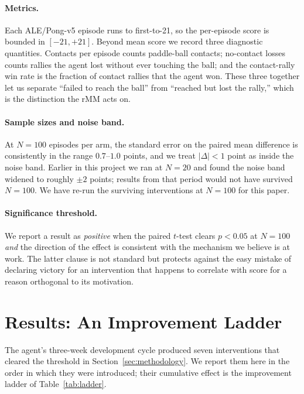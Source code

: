 \documentclass[runningheads]{llncs}
\begin{document}
\paragraph{Metrics.}
Each ALE/Pong-v5 episode runs to first-to-21, so the per-episode
score is bounded in $[-21, +21]$. Beyond mean score we record three
diagnostic quantities. Contacts per episode counts paddle-ball
contacts; no-contact losses counts rallies the agent lost without
ever touching the ball; and the contact-rally win rate is the
fraction of contact rallies that the agent won. These three
together let us separate ``failed to reach the ball'' from
``reached but lost the rally,'' which is the distinction the rMM
acts on.

\paragraph{Sample sizes and noise band.}
At $N=100$ episodes per arm, the standard error on the paired mean
difference is consistently in the range $0.7$--$1.0$ points, and we
treat $|\Delta| < 1$ point as inside the noise band. Earlier in
this project we ran at $N=20$ and found the noise band widened to
roughly $\pm 2$ points; results from that period would not have
survived $N=100$. We have re-run the surviving interventions at
$N=100$ for this paper.

\paragraph{Significance threshold.}
We report a result as \emph{positive} when the paired $t$-test
clears $p < 0.05$ at $N=100$ \emph{and} the direction of the effect
is consistent with the mechanism we believe is at work. The latter
clause is not standard but protects against the easy mistake of
declaring victory for an intervention that happens to correlate
with score for a reason orthogonal to its motivation.

\section{Results: An Improvement Ladder}\label{sec:results}

The agent's three-week development cycle produced seven
interventions that cleared the threshold in
Section~\ref{sec:methodology}. We report them here in the order in
which they were introduced; their cumulative effect is the
improvement ladder of Table~\ref{tab:ladder}.
\end{document}
